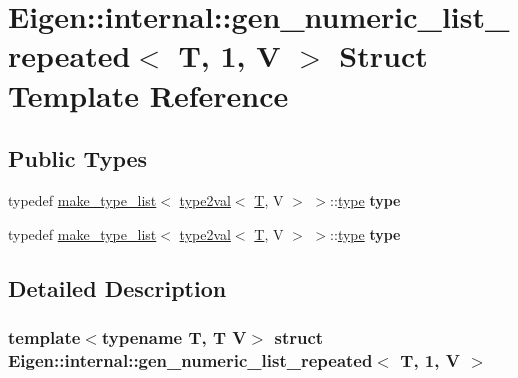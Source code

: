 \hypertarget{struct_eigen_1_1internal_1_1gen__numeric__list__repeated_3_01_t_00_011_00_01_v_01_4}{}\section{Eigen\+:\+:internal\+:\+:gen\+\_\+numeric\+\_\+list\+\_\+repeated$<$ T, 1, V $>$ Struct Template Reference}
\label{struct_eigen_1_1internal_1_1gen__numeric__list__repeated_3_01_t_00_011_00_01_v_01_4}
\subsection*{Public Types}
\begin{DoxyCompactItemize}
\item 
\mbox{\label{struct_eigen_1_1internal_1_1gen__numeric__list__repeated_3_01_t_00_011_00_01_v_01_4_ac1bc12ab968c68b8937cb90a9e4387e7}} 
typedef \hyperlink{struct_eigen_1_1internal_1_1make__type__list}{make\+\_\+type\+\_\+list}$<$ \hyperlink{struct_eigen_1_1internal_1_1type2val}{type2val}$<$ \hyperlink{group___sparse_core___module}{T}, V $>$ $>$\+::\hyperlink{struct_eigen_1_1internal_1_1type__list}{type} {\bfseries type}
\item 
\mbox{\label{struct_eigen_1_1internal_1_1gen__numeric__list__repeated_3_01_t_00_011_00_01_v_01_4_ac1bc12ab968c68b8937cb90a9e4387e7}} 
typedef \hyperlink{struct_eigen_1_1internal_1_1make__type__list}{make\+\_\+type\+\_\+list}$<$ \hyperlink{struct_eigen_1_1internal_1_1type2val}{type2val}$<$ \hyperlink{group___sparse_core___module}{T}, V $>$ $>$\+::\hyperlink{struct_eigen_1_1internal_1_1type__list}{type} {\bfseries type}
\end{DoxyCompactItemize}


\subsection{Detailed Description}
\subsubsection*{template$<$typename T, T V$>$\newline
struct Eigen\+::internal\+::gen\+\_\+numeric\+\_\+list\+\_\+repeated$<$ T, 1, V $>$}



